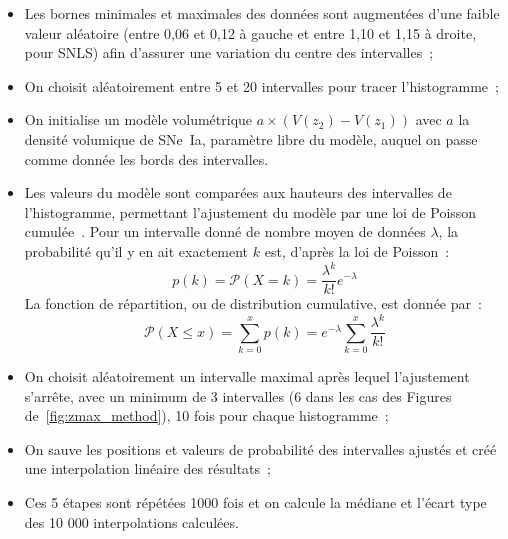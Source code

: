 \documentclass[../main/main.tex]{subfiles}
\begin{document}
\begin{itemize}
    \item Les bornes minimales et maximales des données sont augmentées d'une
        faible valeur aléatoire (entre 0,06 et 0,12 à gauche et entre 1,10 et
        1,15 à droite, pour SNLS) afin d'assurer une variation du centre des
        intervalles~;
    \item On choisit aléatoirement entre 5 et 20 intervalles pour tracer
        l'histogramme~;
    \item On initialise un modèle volumétrique $a\times
        \left(V(z_2)-V(z_1)\right)$ avec $a$ la densité volumique de SNe~Ia,
        paramètre libre du modèle, auquel on passe comme donnée les bords des
        intervalles.
    \item Les valeurs du modèle sont comparées aux hauteurs des intervalles de
        l'histogramme, permettant l'ajustement du modèle par une loi de Poisson
        cumulée~\citep[voir par exemple][]{syed2015}. Pour un intervalle donné
        de nombre moyen de données $\lambda$, la probabilité qu'il y en ait
        exactement $k$ est, d'après la loi de Poisson~:
        \begin{equation}\label{eq:poisson}
            p(k) = \mathcal{P}(X = k) = \frac{\lambda^k}{k!}e^{-\lambda}
        \end{equation}
        La fonction de répartition, ou de distribution cumulative, est donnée
        par~:
        \begin{equation}\label{eq:pcdf}
            \mathcal{P}(X\leq x) = \sum_{k=0}^{x}p(k) = e^{-\lambda}
            \sum_{k=0}^{x} \frac{\lambda^k}{k!}
        \end{equation}
    \item On choisit aléatoirement un intervalle maximal après lequel
        l'ajustement s'arrête, avec un minimum de 3 intervalles (6 dans les cas
        des Figures de~\ref{fig:zmax_method}), 10 fois pour chaque histogramme~;
    \item On sauve les positions et valeurs de probabilité des intervalles
        ajustés et créé une interpolation linéaire des résultats~;
    \item Ces 5 étapes sont répétées 1000 fois et on calcule la médiane et
        l'écart type des 10 000 interpolations calculées.
\end{itemize}
\end{document}
